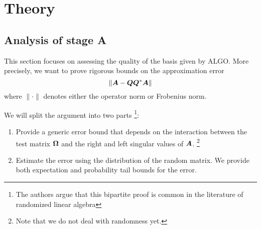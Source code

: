 \section*{Theory}
\subsection{Analysis of stage A} 
This section focuses on assessing the quality of the basis given
by ALGO. More precisely, we want to prove rigorous bounds on the
approximation error
$$ \|\bm{A}-\bm{Q}\bm{Q}^*\bm{A}\| $$
where $\|\cdot\|$ denotes either the operator norm or Frobenius norm.

We will split the argument into two parts \footnote{The authors
argue that this bipartite proof
is common in the literature of randomized linear algebra}:
\begin{enumerate}
  \item Provide a generic error bound that depends on the interaction
  between the test matrix $\bm{\Omega}$ and the right and left
  singular values of $\bm{A}$. \footnote{Note that we do not deal
  with randomness yet.} 
  \item Estimate the error using the distribution of the random matrix.
  We provide both expectation and probability tail bounds for the error.
\end{enumerate}

